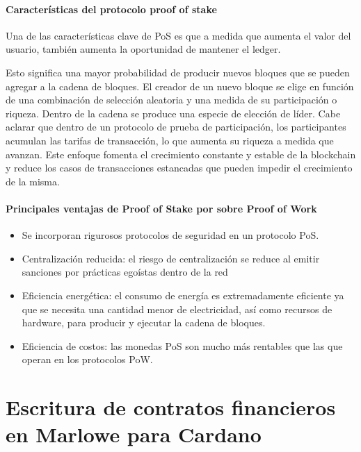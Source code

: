 \documentclass[12pt]{book}
\begin{document}
\subsubsection{Características del protocolo proof of stake}

Una de las características clave de PoS es que a medida que aumenta el valor del usuario, también aumenta la oportunidad de mantener el ledger.

Esto significa una mayor probabilidad de producir nuevos bloques que se pueden agregar a la cadena de bloques. El creador de un nuevo bloque se elige en función de una combinación de selección aleatoria y una medida de su participación o riqueza. Dentro de la cadena se produce una especie de elección de líder. Cabe aclarar que dentro de un protocolo de prueba de participación, los participantes acumulan las tarifas de transacción, lo que aumenta su riqueza a medida que avanzan. Este enfoque fomenta el crecimiento constante y estable de la blockchain y reduce los casos de transacciones estancadas que pueden impedir el crecimiento de la misma.

\subsubsection{Principales ventajas de Proof of Stake por sobre Proof of Work}

\begin{itemize}
    \item Se incorporan rigurosos protocolos de seguridad en un protocolo PoS.
    \item Centralización reducida: el riesgo de centralización se reduce al emitir sanciones por prácticas egoístas dentro de la red
    \item Eficiencia energética: el consumo de energía es extremadamente eficiente ya que se necesita una cantidad menor de electricidad, así como recursos de hardware, para producir y ejecutar la cadena de bloques.
    \item Eficiencia de costos: las monedas PoS son mucho más rentables que las que operan en los protocolos PoW.
\end{itemize}






\chapter[Escritura de contratos financieros en
Marlowe]{Escritura de contratos financieros en Marlowe para Cardano}
\end{document}
